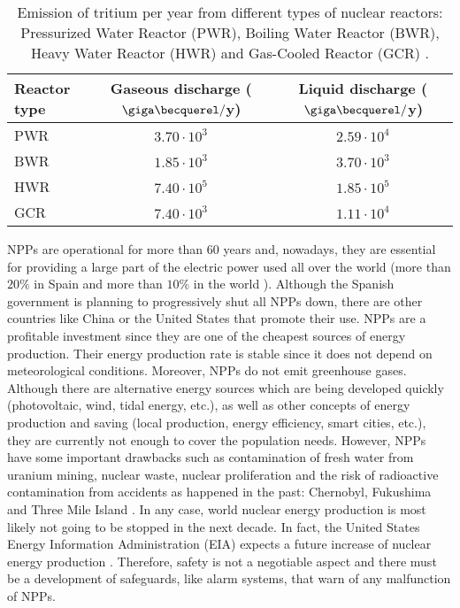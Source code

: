 \begin{table}[htbp]
\centering{}%
\begin{tabular}{lcc}
\toprule 
Reactor type & Gaseous discharge ($\giga\becquerel/$y) & Liquid discharge ($\giga\becquerel/$y)\tabularnewline
\midrule
\midrule 
PWR & $3.70\cdot 10^{3}$ & $2.59\cdot 10^{4}$ \tabularnewline
BWR & $1.85\cdot 10^{3}$ & $3.70\cdot 10^{3}$ \tabularnewline
HWR & $7.40\cdot 10^{5}$ & $1.85\cdot 10^{5}$ \tabularnewline
GCR & $7.40\cdot 10^{3}$ & $1.11\cdot 10^{4}$ \tabularnewline
\bottomrule
\end{tabular}
\caption{Emission of tritium per year from different types of nuclear reactors: Pressurized Water Reactor (PWR), Boiling Water Reactor (BWR), Heavy Water Reactor (HWR) and Gas-Cooled Reactor (GCR) \cite{CommonEmissionTritium}.}
\label{tab:TritiumEmisionsNPPs}
\end{table}

NPPs are operational for more than 60 years and, nowadays, they are essential for providing a large part of the electric power used all over the world (more than $20\%$ in Spain \cite{PercentageEnergySpain} and more than $10\%$ in the world \cite{PercentageEnergyWorld}). Although the Spanish government is planning to progressively shut all NPPs down, there are other countries like China \cite{60ReactorsChina} or the United States \cite{35MillionsUSA} that promote their use. NPPs are a profitable investment since they are one of the cheapest sources of energy production. Their energy production rate is stable since it does not depend on meteorological conditions. Moreover, NPPs do not emit greenhouse gases. Although there are alternative energy sources which are being developed quickly (photovoltaic, wind, tidal energy, etc.), as well as other concepts of energy production and saving (local production, energy efficiency, smart cities, etc.), they are currently not enough to cover the population needs. However, NPPs have some important drawbacks such as contamination of fresh water from uranium mining, nuclear waste, nuclear proliferation and the risk of radioactive contamination from accidents as happened in the past: Chernobyl, Fukushima and Three Mile Island \cite{ThreeMileIsland}. In any case, world nuclear energy production is most likely not going to be stopped in the next decade. In fact, the United States Energy Information Administration (EIA) expects a future increase of nuclear energy production \cite{EIAOutlook}. Therefore, safety is not a negotiable aspect and there must be a development of safeguards, like alarm systems, that warn of any malfunction of NPPs. 

